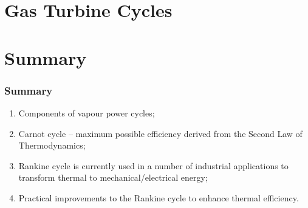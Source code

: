 \documentclass[10pt,compress]{beamer}
\begin{document}
\section{Gas Turbine Cycles}








\section{Summary}
\begin{frame}
 \frametitle{Summary}
  \begin{enumerate}
   \item Components of vapour power cycles;
   \item Carnot cycle -- maximum possible efficiency derived from the Second Law of Thermodynamics;
   \item Rankine cycle is currently used in a number of industrial applications to transform thermal to mechanical/electrical energy;
   \item Practical improvements to the Rankine cycle to enhance thermal efficiency.
  \end{enumerate}
\end{frame}
\end{document}
